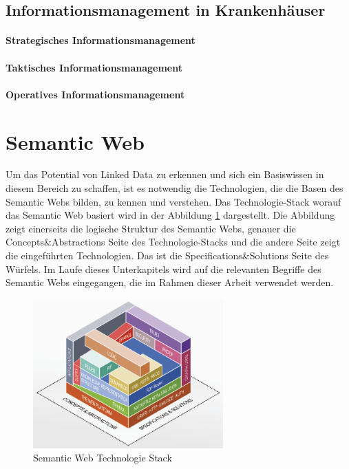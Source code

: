 \subsection{Informationsmanagement in Krankenhäuser}

\paragraph{Strategisches Informationsmanagement}

\paragraph{Taktisches Informationsmanagement}

\paragraph{Operatives Informationsmanagement}

\section{Semantic Web}\label{sec:sw}

Um das Potential von Linked Data zu erkennen und sich ein Basiswissen in diesem Bereich zu schaffen, ist es notwendig die Technologien, die die Basen des Semantic Webs bilden, zu kennen und verstehen. 
Das Technologie-Stack worauf das Semantic Web basiert wird in der Abbildung \ref{fig:abb1} dargestellt.
Die Abbildung zeigt einerseits die logische Struktur des Semantic Webs, genauer die Concepts\&Abstractions Seite des Technologie-Stacks und die andere Seite zeigt die eingeführten Technologien.
Das ist die Specifications\&Solutions Seite des Würfels.
Im Laufe dieses Unterkapitels wird auf die relevanten Begriffe des Semantic Webs eingegangen, die im Rahmen dieser Arbeit verwendet werden.

\begin{figure}[h]
	\centering
    	\includegraphics[width=0.65\textwidth]{Images/Linked_Data_Tech_Stack}
   	\caption{Semantic Web Technologie Stack}
   	\label{fig:abb1}
\end{figure}

